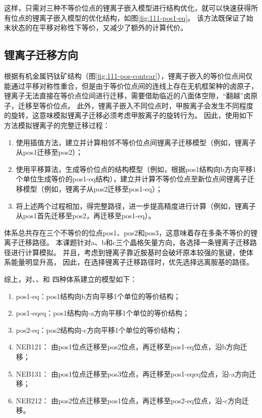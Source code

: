 这样，只需对三种不等价位点的锂离子嵌入模型进行结构优化，就可以快速获得所有位点的锂离子嵌入模型的优化结构，如图\ref{fig:111-pos1-eq}。
该方法既保证了始末状态的在平移对称性下等价，又减少了额外的计算代价。

\subsection{锂离子迁移方向}

根据有机金属钙钛矿结构（图\ref{fig:111-pos-contcar}），锂离子嵌入的等价位点间仅能通过平移对称性重合，但是由于等价位点间的连线上存在无机框架种的卤原子，锂离子无法直接在等价点位间进行迁移，需要借助临近的八面体空隙，“翻越”卤原子，迁移至等价位点。
此外，锂离子嵌入不同位点时，甲胺离子会发生不同程度的旋转，这意味模拟锂离子迁移必须考虑甲胺离子的旋转行为。
因此，使用如下方法模拟锂离子的完整迁移过程：
\begin{enumerate}
    \item 使用插值方法，建立并计算相邻不等价位点间锂离子迁移模型（例如，锂离子从pos1迁移至pos2）；
    \item 使用平移算法，生成等价位点的结构模型（例如，根据pos1结构向b方向平移1个单位生成等价的pos1-eq结构），建立并计算不等价位点至新位点间锂离子迁移模型（例如，锂离子从pos2迁移至pos1-eq）；
    \item 将上述两个过程相加，得完整路径，进一步提高精度进行计算（例如，锂离子从pos1首先迁移至pos2，再迁移至pos1-eq）。
\end{enumerate}


体系总共存在三个不等价的位点pos1、pos2和pos3，这意味着存在多条不等价的锂离子迁移路径。
本课题针对a、b和c三个晶格矢量方向，各选择一条锂离子迁移路径进行计算模拟。
并且，考虑到锂离子靠近胺基时会破坏原本较强的氢键，使体系能量明显升高，
因此，在选择锂离子迁移路径时，优先选择远离胺基的路径。


综上，对、、和 四种体系建立的模型如下：
\begin{enumerate}
    \item pos1-eq：pos1结构向b方向平移1个单位的等价结构；
    \item pos1-eqeq：pos1结构向-a方向平移1个单位的等价结构；
    \item pos2-eq：pos2结构向-c方向平移1个单位的等价结构；
    \item NEB121： 由pos1位点迁移至pos2位点，再迁移至pos1-eq位点，沿b方向迁移；
    \item NEB131： 由pos1位点迁移至pos3位点，再迁移至pos1-eqeq位点，沿-a方向迁移；
    \item NEB212： 由pos2位点迁移至pos1位点，再迁移至pos2-eq位点，沿-c方向迁移。
\end{enumerate}

